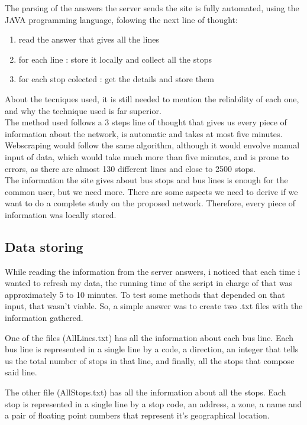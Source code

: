 \documentclass[12pt]{article}
\begin{document}
\begin{multicols}{2}
The parsing of the answers the server sends the site is fully automated, using the JAVA programming language, folowing the next line of thought:

\begin{enumerate}
\item read the answer that gives all the lines
\item for each line : store it locally and collect all the stops
\item for each stop colected : get the details and store them
\end{enumerate}

About the tecniques used, it is still needed to mention the reliability of each one, and why the technique used is far superior.\\
	The method used follows a 3 steps line of thought that gives us every piece of information about the network, is automatic and takes at most five minutes.\\
	Webscraping would follow the same algorithm, although it would envolve manual input of data, which would take much more than five minutes, and is prone to errors, as there are almost 130 different lines and close to 2500 stops.\\
	
The information the site gives about bus stops and bus lines is enough for the common user, but we need more. There are some aspects we need to derive if we want to do a complete study on the proposed network. Therefore, every piece of information was locally stored.

\subsection{Data storing}
While reading the information from the server answers, i noticed that each time i wanted to refresh my data, the running time of the script in charge of that was approximately 5 to 10 minutes. To test some methods that depended on that input, that wasn't viable. 
So, a simple answer was to create two .txt files with the information gathered.

One of the files (AllLines.txt) has all the information about each bus line.
Each bus line is represented in a single line by a code, a direction, an integer that tells us the total number of stops in that line, and finally, all the stops that compose said line.

The other file (AllStops.txt) has all the information about all the stops.
Each stop is represented in a single line by a stop code, an address, a zone, a name and a pair of floating point numbers that represent it's geographical location. 


\end{multicols}
\end{document}
